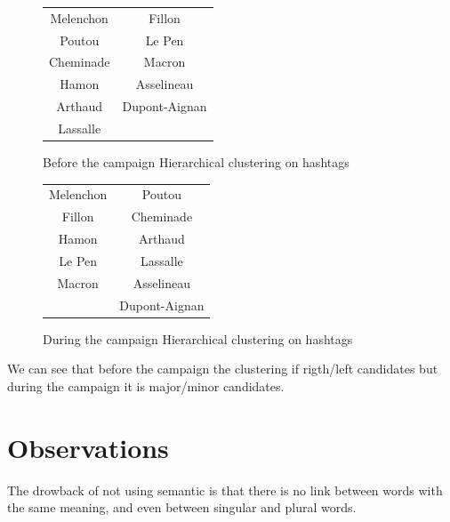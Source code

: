 \documentclass[a4paper]{article}
\theoremstyle{definition}
\begin{document}
\begin{figure}
\begin{center}
\begin{multicols}{2}
\label{fig:image5}
\begin{tabular}{ | c | c |}
\hline
Melenchon & Fillon\\
Poutou & Le Pen\\
Cheminade & Macron\\
Hamon & Asselineau\\
Arthaud & Dupont-Aignan\\
Lassalle \\
\hline
\end{tabular}
\caption{Before the campaign Hierarchical clustering on hashtags}
\bigskip

\begin{tabular}{ | c | c |}
\hline
Melenchon & Poutou\\
Fillon & Cheminade\\
Hamon & Arthaud\\
Le Pen & Lassalle\\
Macron & Asselineau\\
& Dupont-Aignan\\
\hline
\end{tabular}
\bigskip
\caption{During the campaign Hierarchical clustering on hashtags}
\end{multicols}
\end{center}
\end{figure}

We can see that before the campaign the clustering if rigth/left candidates but during the campaign it is major/minor candidates.


\section{Observations}
The drowback of not using semantic is that there is no link between words with the same meaning, and even between singular and plural words.
\end{document}

